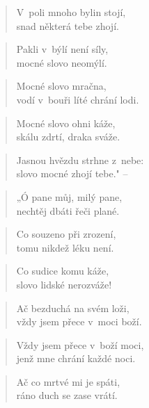\begin{verse}
V~poli mnoho bylin stojí, \\
snad některá tebe zhojí.
\end{verse}

\begin{verse}
Pakli v~býlí není síly, \\
mocné slovo neomýlí.
\end{verse}

\begin{verse}
Mocné slovo mračna, \\
vodí v~bouři líté chrání lodi.
\end{verse}

\begin{verse}
Mocné slovo ohni káže, \\
skálu zdrtí, draka sváže.
\end{verse}

\begin{verse}
Jasnou hvězdu strhne z~nebe: \\
slovo mocné zhojí tebe." --
\end{verse}

\begin{verse}
„Ó pane můj, milý pane, \\
nechtěj dbáti řeči plané.
\end{verse}

\begin{verse}
Co souzeno při zrození, \\
tomu nikdež léku není.
\end{verse}

\begin{verse}
Co sudice komu káže, \\
slovo lidské nerozváže!
\end{verse}

\begin{verse}
Ač bezduchá na svém loži, \\
vždy jsem přece v~moci boží.
\end{verse}

\begin{verse}
Vždy jsem přece v~boží moci, \\
jenž mne chrání každé noci.
\end{verse}

\begin{verse}
Ač co mrtvé mi je spáti, \\
ráno duch se zase vrátí.
\end{verse}

